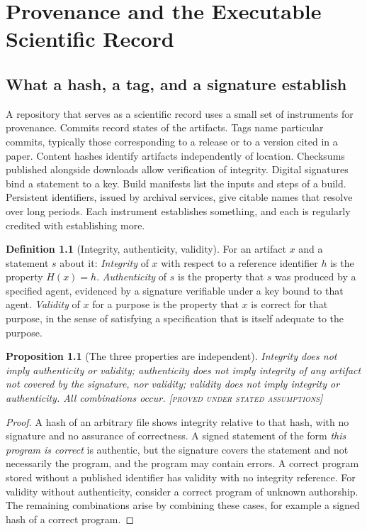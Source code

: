 \documentclass[11pt,twoside,openright]{book}
\theoremstyle{plain}
\newtheorem{proposition}[theorem]{Proposition}
\theoremstyle{definition}
\newtheorem{definition}[theorem]{Definition}
\theoremstyle{remark}
\newcommand{\Proved}{\textup{\textsc{[proved under stated assumptions]}}}
\begin{document}
\chapter{Provenance and the Executable Scientific Record}\label{ch:provenance}

\section{What a hash, a tag, and a signature establish}

A repository that serves as a scientific record uses a small set of instruments for provenance. Commits record states of the artifacts. Tags name particular commits, typically those corresponding to a release or to a version cited in a paper. Content hashes identify artifacts independently of location. Checksums published alongside downloads allow verification of integrity. Digital signatures bind a statement to a key. Build manifests list the inputs and steps of a build. Persistent identifiers, issued by archival services, give citable names that resolve over long periods. Each instrument establishes something, and each is regularly credited with establishing more.

\begin{definition}[Integrity, authenticity, validity]\label{def:iav}
For an artifact $x$ and a statement $s$ about it:
\emph{Integrity} of $x$ with respect to a reference identifier $h$ is the property $H(x)=h$.
\emph{Authenticity} of $s$ is the property that $s$ was produced by a specified agent, evidenced by a signature verifiable under a key bound to that agent.
\emph{Validity} of $x$ for a purpose is the property that $x$ is correct for that purpose, in the sense of satisfying a specification that is itself adequate to the purpose.
\end{definition}

\begin{proposition}[The three properties are independent]\label{prop:iav}
Integrity does not imply authenticity or validity; authenticity does not imply integrity of any artifact not covered by the signature, nor validity; validity does not imply integrity or authenticity. All combinations occur.
\Proved{}
\end{proposition}

\begin{proof}
A hash of an arbitrary file shows integrity relative to that hash, with no signature and no assurance of correctness. A signed statement of the form \emph{this program is correct} is authentic, but the signature covers the statement and not necessarily the program, and the program may contain errors. A correct program stored without a published identifier has validity with no integrity reference. For validity without authenticity, consider a correct program of unknown authorship. The remaining combinations arise by combining these cases, for example a signed hash of a correct program.
\end{proof}
\end{document}
